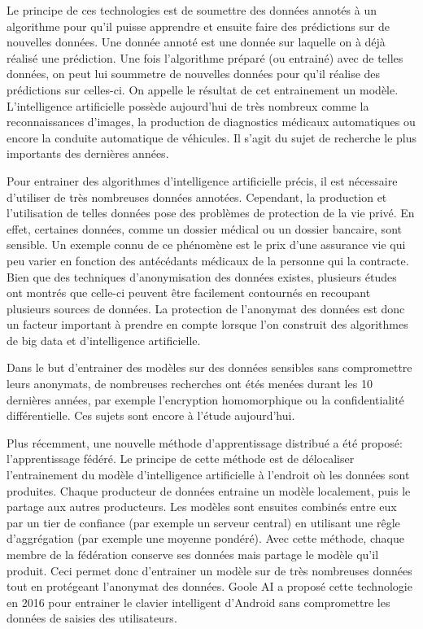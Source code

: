 \documentclass[stage3a]{tnreport} %
\begin{document}
Le principe de ces technologies est de soumettre des données annotés à un algorithme pour qu'il puisse apprendre et ensuite faire des prédictions sur de nouvelles données. Une donnée annoté est une donnée sur laquelle on à déjà réalisé une prédiction. Une fois l'algorithme préparé (ou entrainé) avec de telles données, on peut lui soummetre de nouvelles données pour qu'il réalise des prédictions sur celles-ci. On appelle le résultat de cet entrainement un modèle. L'intelligence artificielle possède aujourd'hui de très nombreux comme la reconnaissances d'images, la production de diagnostics médicaux automatiques ou encore la conduite automatique de véhicules. Il s'agit du sujet de recherche le plus importants des dernières années.

Pour entrainer des algorithmes d'intelligence artificielle précis, il est nécessaire d'utiliser de très nombreuses données annotées. Cependant, la production et l'utilisation de telles données pose des problèmes de protection de la vie privé. En effet, certaines données, comme un dossier médical ou un dossier bancaire, sont sensible. Un exemple connu de ce phénomène est le prix d'une assurance vie qui peu varier en fonction des antécédants médicaux de la personne qui la contracte. Bien que des techniques d'anonymisation des données existes, plusieurs études ont montrés que celle-ci peuvent être facilement contournés en recoupant plusieurs sources de données. La protection de l'anonymat des données est donc un facteur important à prendre en compte lorsque l'on construit des algorithmes de big data et d'intelligence artificielle.

Dans le but d'entrainer des modèles sur des données sensibles sans compromettre leurs anonymats, de nombreuses recherches ont étés menées durant les 10 dernières années, par exemple  l'encryption homomorphique ou la confidentialité différentielle. Ces sujets sont encore à l'étude aujourd'hui.

Plus récemment, une nouvelle méthode d'apprentissage distribué a été proposé: l'apprentissage fédéré. Le principe de cette méthode est de délocaliser l'entrainement du modèle d'intelligence artificielle à l'endroit où les données sont produites. Chaque producteur de données entraine un modèle localement, puis le partage aux autres producteurs. Les modèles sont ensuites combinés entre eux par un tier de confiance (par exemple un serveur central) en utilisant une rêgle d'aggrégation (par exemple une moyenne pondéré). Avec cette méthode, chaque membre de la fédération conserve ses données mais partage le modèle qu'il produit. Ceci permet donc d'entrainer un modèle sur de très nombreuses données tout en protégeant l'anonymat des données. Goole AI a proposé cette technologie en 2016 pour entrainer le clavier intelligent d'Android sans compromettre les données de saisies des utilisateurs.
\end{document}
